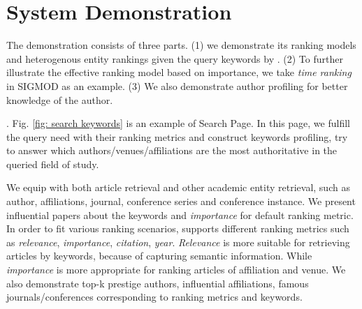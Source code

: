 \section{System Demonstration}\label{sec-demo}
\par The demonstration consists of three parts. (1) we demonstrate its ranking models and heterogenous entity rankings given the query keywords by \oursystem. (2) To further illustrate the effective ranking model based on importance, we take {\em time ranking} in SIGMOD as an example. (3) We also demonstrate author profiling for better knowledge of the author.


. Fig. \ref{fig: search keywords} is an example of Search Page. In this page, we fulfill the query need with their ranking metrics and construct keywords profiling, try to answer which authors/venues/affiliations are the most authoritative in the queried field of study.

\par
We equip \oursystem with both article retrieval and other academic entity retrieval, such as author, affiliations, journal, conference series and conference instance. We present influential papers about the keywords and {\em importance} for default ranking metric. In order to fit various ranking scenarios, \oursystem supports different ranking metrics such as {\em relevance}, {\em importance}, {\em citation}, {\em year}. {\em Relevance} is more suitable for retrieving articles by keywords, because of capturing semantic information. While {\em importance} is more appropriate for ranking articles of affiliation and venue. We also demonstrate top-k prestige authors, influential affiliations, famous journals/conferences corresponding to ranking metrics and keywords.


